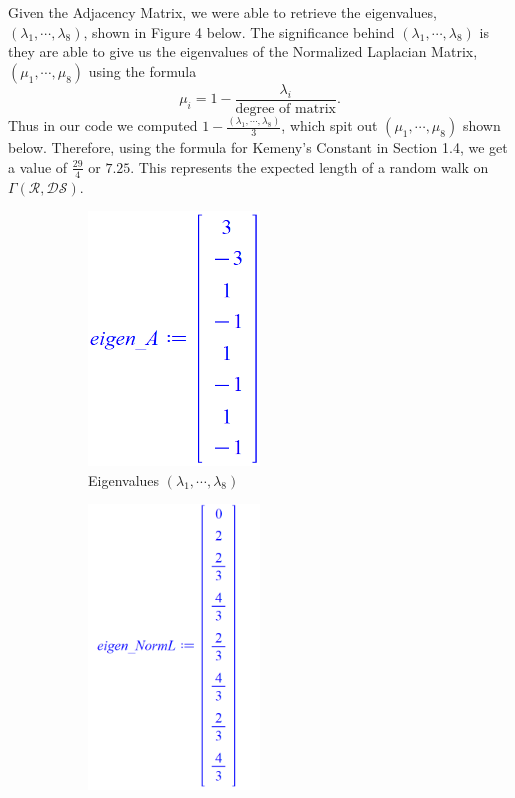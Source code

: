 \documentclass{article}
\begin{document}
Given the Adjacency Matrix, we were able to retrieve the eigenvalues, $(\lambda_1,\cdots,\lambda_8)$, shown in Figure 4 below.  The significance behind $(\lambda_1,\cdots,\lambda_8)$ is they are able to give us the eigenvalues of the Normalized Laplacian Matrix, $(\mu_1,\cdots,\mu_8)$ using the formula $$\mu_i = 1-\frac{\lambda_i}{\text{degree of matrix}}.$$  Thus in our code we computed $1-\frac{(\lambda_1,\cdots,\lambda_8)}{3}$, which spit out $(\mu_1,\cdots,\mu_8)$ shown below.  Therefore, using the formula for Kemeny's Constant in Section 1.4, we get a value of $\frac{29}{4}$ or $7.25$.  This represents the expected length of a random walk on $\Gamma(\mathcal{R},\mathcal{DS})$.  

\begin{figure}[!ht]
    \centering
    \begin{subfigure}[b]{0.4\textwidth}
        \centering
        \includegraphics[width=0.5\textwidth]{images/AdjEigen.png}
        \caption{Eigenvalues $(\lambda_1,\cdots,\lambda_8)$}
        \label{fig:Adjacency eigenvalues}
    \end{subfigure}
    \hfill
    \begin{subfigure}[b]{0.4\textwidth}
        \centering
        \includegraphics[width=0.5\textwidth]{images/NormEigen.png}

\end{subfigure}
\end{figure}
\end{document}
